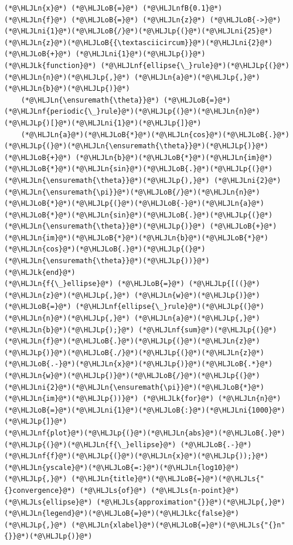 \documentclass[12pt,a4paper]{article}
\newcommand{\HLJLk}[1]{\textcolor[RGB]{148,91,176}{\textbf{#1}}}
\newcommand{\HLJLkc}[1]{\textcolor[RGB]{59,151,46}{\textit{#1}}}
\newcommand{\HLJLn}[1]{#1}
\newcommand{\HLJLnf}[1]{\textcolor[RGB]{66,102,213}{#1}}
\newcommand{\HLJLs}[1]{\textcolor[RGB]{201,61,57}{#1}}
\newcommand{\HLJLnfB}[1]{\textcolor[RGB]{59,151,46}{#1}}
\newcommand{\HLJLni}[1]{\textcolor[RGB]{59,151,46}{#1}}
\newcommand{\HLJLoB}[1]{\textcolor[RGB]{102,102,102}{\textbf{#1}}}
\newcommand{\HLJLp}[1]{#1}
\begin{document}
\begin{lstlisting}
(*@\HLJLn{x}@*) (*@\HLJLoB{=}@*) (*@\HLJLnfB{0.1}@*)
(*@\HLJLn{f}@*) (*@\HLJLoB{=}@*) (*@\HLJLn{z}@*) (*@\HLJLoB{->}@*) (*@\HLJLni{1}@*)(*@\HLJLoB{/}@*)(*@\HLJLp{(}@*)(*@\HLJLni{25}@*)(*@\HLJLn{z}@*)(*@\HLJLoB{{\textasciicircum}}@*)(*@\HLJLni{2}@*) (*@\HLJLoB{+}@*) (*@\HLJLni{1}@*)(*@\HLJLp{)}@*)
(*@\HLJLk{function}@*) (*@\HLJLnf{ellipse{\_}rule}@*)(*@\HLJLp{(}@*)(*@\HLJLn{n}@*)(*@\HLJLp{,}@*) (*@\HLJLn{a}@*)(*@\HLJLp{,}@*) (*@\HLJLn{b}@*)(*@\HLJLp{)}@*) 
    (*@\HLJLn{\ensuremath{\theta}}@*) (*@\HLJLoB{=}@*) (*@\HLJLnf{periodic{\_}rule}@*)(*@\HLJLp{(}@*)(*@\HLJLn{n}@*)(*@\HLJLp{)[}@*)(*@\HLJLni{1}@*)(*@\HLJLp{]}@*)
    (*@\HLJLn{a}@*)(*@\HLJLoB{*}@*)(*@\HLJLn{cos}@*)(*@\HLJLoB{.}@*)(*@\HLJLp{(}@*)(*@\HLJLn{\ensuremath{\theta}}@*)(*@\HLJLp{)}@*) (*@\HLJLoB{+}@*) (*@\HLJLn{b}@*)(*@\HLJLoB{*}@*)(*@\HLJLn{im}@*)(*@\HLJLoB{*}@*)(*@\HLJLn{sin}@*)(*@\HLJLoB{.}@*)(*@\HLJLp{(}@*)(*@\HLJLn{\ensuremath{\theta}}@*)(*@\HLJLp{),}@*) (*@\HLJLni{2}@*)(*@\HLJLn{\ensuremath{\pi}}@*)(*@\HLJLoB{/}@*)(*@\HLJLn{n}@*)(*@\HLJLoB{*}@*)(*@\HLJLp{(}@*)(*@\HLJLoB{-}@*)(*@\HLJLn{a}@*)(*@\HLJLoB{*}@*)(*@\HLJLn{sin}@*)(*@\HLJLoB{.}@*)(*@\HLJLp{(}@*)(*@\HLJLn{\ensuremath{\theta}}@*)(*@\HLJLp{)}@*) (*@\HLJLoB{+}@*) (*@\HLJLn{im}@*)(*@\HLJLoB{*}@*)(*@\HLJLn{b}@*)(*@\HLJLoB{*}@*)(*@\HLJLn{cos}@*)(*@\HLJLoB{.}@*)(*@\HLJLp{(}@*)(*@\HLJLn{\ensuremath{\theta}}@*)(*@\HLJLp{))}@*)
(*@\HLJLk{end}@*)
(*@\HLJLn{f{\_}ellipse}@*) (*@\HLJLoB{=}@*) (*@\HLJLp{[((}@*)(*@\HLJLn{z}@*)(*@\HLJLp{,}@*) (*@\HLJLn{w}@*)(*@\HLJLp{)}@*) (*@\HLJLoB{=}@*) (*@\HLJLnf{ellipse{\_}rule}@*)(*@\HLJLp{(}@*)(*@\HLJLn{n}@*)(*@\HLJLp{,}@*) (*@\HLJLn{a}@*)(*@\HLJLp{,}@*) (*@\HLJLn{b}@*)(*@\HLJLp{);}@*) (*@\HLJLnf{sum}@*)(*@\HLJLp{(}@*)(*@\HLJLn{f}@*)(*@\HLJLoB{.}@*)(*@\HLJLp{(}@*)(*@\HLJLn{z}@*)(*@\HLJLp{)}@*)(*@\HLJLoB{./}@*)(*@\HLJLp{(}@*)(*@\HLJLn{z}@*)(*@\HLJLoB{.-}@*)(*@\HLJLn{x}@*)(*@\HLJLp{)}@*)(*@\HLJLoB{.*}@*)(*@\HLJLn{w}@*)(*@\HLJLp{)}@*)(*@\HLJLoB{/}@*)(*@\HLJLp{(}@*)(*@\HLJLni{2}@*)(*@\HLJLn{\ensuremath{\pi}}@*)(*@\HLJLoB{*}@*)(*@\HLJLn{im}@*)(*@\HLJLp{))}@*) (*@\HLJLk{for}@*) (*@\HLJLn{n}@*)(*@\HLJLoB{=}@*)(*@\HLJLni{1}@*)(*@\HLJLoB{:}@*)(*@\HLJLni{1000}@*)(*@\HLJLp{]}@*)
(*@\HLJLnf{plot}@*)(*@\HLJLp{(}@*)(*@\HLJLn{abs}@*)(*@\HLJLoB{.}@*)(*@\HLJLp{(}@*)(*@\HLJLn{f{\_}ellipse}@*) (*@\HLJLoB{.-}@*) (*@\HLJLnf{f}@*)(*@\HLJLp{(}@*)(*@\HLJLn{x}@*)(*@\HLJLp{));}@*) (*@\HLJLn{yscale}@*)(*@\HLJLoB{=:}@*)(*@\HLJLn{log10}@*)(*@\HLJLp{,}@*) (*@\HLJLn{title}@*)(*@\HLJLoB{=}@*)(*@\HLJLs{"{}convergence}@*) (*@\HLJLs{of}@*) (*@\HLJLs{n-point}@*) (*@\HLJLs{ellipse}@*) (*@\HLJLs{approximation"{}}@*)(*@\HLJLp{,}@*) (*@\HLJLn{legend}@*)(*@\HLJLoB{=}@*)(*@\HLJLkc{false}@*)(*@\HLJLp{,}@*) (*@\HLJLn{xlabel}@*)(*@\HLJLoB{=}@*)(*@\HLJLs{"{}n"{}}@*)(*@\HLJLp{)}@*)
\end{lstlisting}
\end{document}
